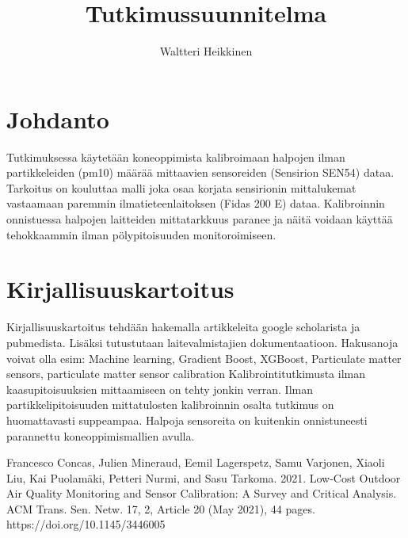 \documentclass[utf8]{gradu3}
\begin{document}
\title{Tutkimussuunnitelma}


\author{Waltteri Heikkinen}


\subject{Tietojenkäsittelytieteen}

\maketitle

\mainmatter

\chapter{Johdanto}

Tutkimuksessa käytetään koneoppimista kalibroimaan halpojen ilman partikkeleiden (pm10) määrää mittaavien sensoreiden (Sensirion SEN54) dataa. Tarkoitus on kouluttaa malli joka osaa korjata sensirionin mittalukemat vastaamaan paremmin ilmatieteenlaitoksen (Fidas 200 E) dataa. Kalibroinnin onnistuessa halpojen laitteiden mittatarkkuus paranee ja näitä voidaan käyttää tehokkaammin ilman pölypitoisuuden monitoroimiseen. 


\chapter{Kirjallisuuskartoitus}

Kirjallisuuskartoitus tehdään hakemalla artikkeleita google scholarista ja pubmedista. Lisäksi tutustutaan laitevalmistajien dokumentaatioon. Hakusanoja voivat olla esim: Machine learning, Gradient Boost, XGBoost, Particulate matter sensors, particulate matter sensor calibration
Kalibrointitutkimusta ilman kaasupitoisuuksien mittaamiseen on tehty jonkin verran. Ilman partikkelipitoisuuden mittatulosten kalibroinnin osalta tutkimus on huomattavasti suppeampaa.  Halpoja sensoreita on kuitenkin onnistuneesti parannettu koneoppimismallien avulla.

Francesco Concas, Julien Mineraud, Eemil Lagerspetz, Samu Varjonen, Xiaoli Liu, Kai Puolamäki, Petteri Nurmi, and Sasu Tarkoma. 2021. Low-Cost Outdoor Air Quality Monitoring and Sensor Calibration: A Survey and Critical Analysis. ACM Trans. Sen. Netw. 17, 2, Article 20 (May 2021), 44 pages. https://doi.org/10.1145/3446005
\end{document}
